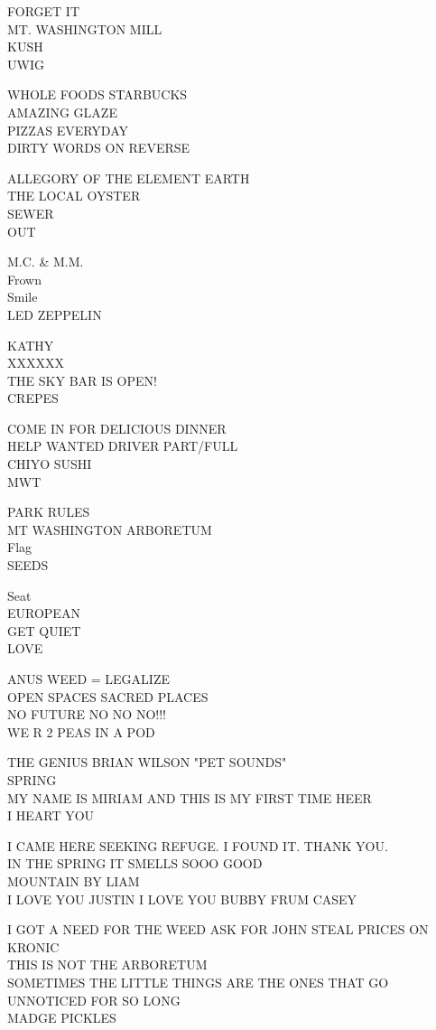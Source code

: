 \documentclass[10pt,letterpaper]{article}
\begin{document}
FORGET IT\\
MT. WASHINGTON MILL\\
KUSH\\
UWIG

WHOLE FOODS STARBUCKS\\
AMAZING GLAZE\\
PIZZAS EVERYDAY\\
DIRTY WORDS ON REVERSE

ALLEGORY OF THE ELEMENT EARTH\\
THE LOCAL OYSTER\\
SEWER\\
OUT

M.C. \& M.M.\\
Frown\\
Smile\\
LED ZEPPELIN

KATHY\\
XXXXXX\\
THE SKY BAR IS OPEN!\\
CREPES

COME IN FOR DELICIOUS DINNER\\
HELP WANTED DRIVER PART/FULL\\
CHIYO SUSHI\\
MWT

PARK RULES\\
MT WASHINGTON ARBORETUM\\
Flag\\
SEEDS

Seat\\
EUROPEAN\\
GET QUIET\\
LOVE

ANUS WEED = LEGALIZE\\
OPEN SPACES SACRED PLACES\\
NO FUTURE NO NO NO!!!\\
WE R 2 PEAS IN A POD

THE GENIUS BRIAN WILSON "PET SOUNDS"\\
SPRING\\
MY NAME IS MIRIAM AND THIS IS MY FIRST TIME HEER\\
I HEART YOU

I CAME HERE SEEKING REFUGE. I FOUND IT.  THANK YOU.\\
IN THE SPRING IT SMELLS SOOO GOOD\\
MOUNTAIN BY LIAM\\
I LOVE YOU JUSTIN I LOVE YOU BUBBY FRUM CASEY

I GOT A NEED FOR THE WEED ASK FOR JOHN STEAL PRICES ON KRONIC\\
THIS IS NOT THE ARBORETUM\\
SOMETIMES THE LITTLE THINGS ARE THE ONES THAT GO UNNOTICED FOR SO LONG\\
MADGE PICKLES
\end{document}

